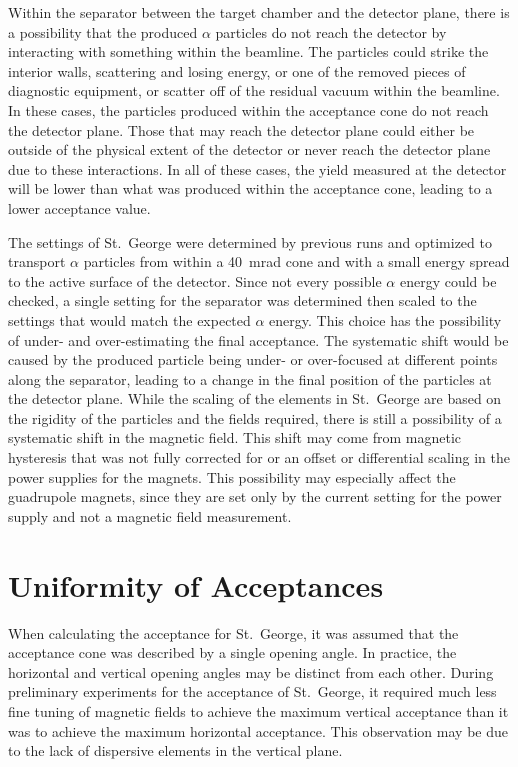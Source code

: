 Within the separator between the target chamber and the detector plane,
there is a possibility that the produced $\alpha$ particles do not reach
the detector by interacting with something within the beamline. The
particles could strike the interior walls, scattering and losing energy,
or one of the removed pieces of diagnostic equipment, or scatter off of
the residual vacuum within the beamline. In these cases, the particles
produced within the acceptance cone do not reach the detector plane.
Those that may reach the detector plane could either be outside of the
physical extent of the detector or never reach the detector plane due
to these interactions. In all of these cases, the yield measured at the
detector will be lower than what was produced within the acceptance
cone, leading to a lower acceptance value.

The settings of St.\ George were determined by previous runs and
optimized to transport $\alpha$ particles from within a 40~mrad cone and
with a small energy spread to the active surface of the detector. Since
not every possible $\alpha$ energy could be checked, a single setting
for the separator was determined then scaled to the settings that would
match the expected $\alpha$ energy. This choice has the possibility of
under- and over-estimating the final acceptance. The systematic shift
would be caused by the produced particle being under- or over-focused at
different points along the separator, leading to a change in the final
position of the particles at the detector plane. While the scaling of
the elements in St.\ George are based on the rigidity of the particles
and the fields required, there is still a possibility of a systematic
shift in the magnetic field. This shift may come from magnetic
hysteresis that was not fully corrected for or an offset or differential
scaling in the power supplies for the magnets. This possibility may
especially affect the guadrupole magnets, since they are set only by the
current setting for the power supply and not a magnetic field
measurement.


\section{Uniformity of Acceptances}
\label{sec:uniformity-of-acceptances}

When calculating the acceptance for St.\ George, it was assumed that the
acceptance cone was described by a single opening angle. In practice,
the horizontal and vertical opening angles may be distinct from each
other. During preliminary experiments for the acceptance of St.\ George,
it required much less fine tuning of magnetic fields to achieve the
maximum vertical acceptance than it was to achieve the maximum
horizontal acceptance. This observation may be due to the lack of
dispersive elements in the vertical plane.

